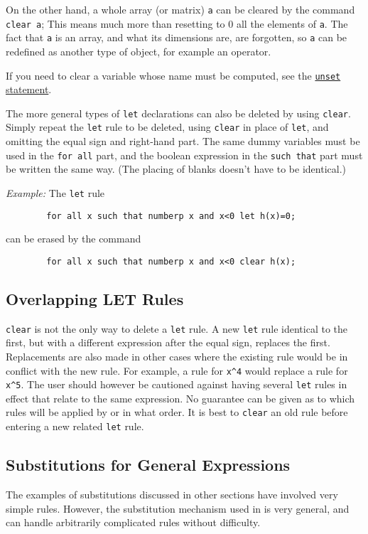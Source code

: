 On the other hand, a whole array (or matrix) \texttt{a} can be cleared by the
command \texttt{clear a};  This means much more than resetting to 0 all the
elements of \texttt{a}.  The fact that \texttt{a} is an array, and what its
dimensions are, are forgotten, so \texttt{a} can be redefined as another type
of object, for example an operator.

If you need to clear a variable whose name must be computed, see the
\hyperlink{command:UNSET}{\texttt{unset} statement}.

The more general types of \texttt{let} declarations can also be deleted by
using \texttt{clear}.  Simply repeat the \texttt{let} rule to be deleted, using
\texttt{clear} in place of \texttt{let}, and omitting the equal sign and
right-hand part.  The same dummy variables must be used in the
\texttt{for all} part, and the boolean expression in the \texttt{such that} part must be
written the same way. (The placing of blanks doesn't have to be
identical.)

\textit{Example:} The \texttt{let} rule
\begin{verbatim}
        for all x such that numberp x and x<0 let h(x)=0;
\end{verbatim}
can be erased by the command
\begin{verbatim}
        for all x such that numberp x and x<0 clear h(x);
\end{verbatim}

\subsection{Overlapping LET Rules}
\texttt{clear} is not the only way to delete a \texttt{let} rule.  A new 
\texttt{let} rule identical to the first, but with a different expression after
the equal sign, replaces the first.  Replacements are also made in other
cases where the existing rule would be in conflict with the new rule.  For
example, a rule for \texttt{x\textasciicircum 4} would replace a rule for 
\texttt{x\textasciicircum 5}.
The user should however be cautioned against having several \texttt{let}
rules in effect that relate to the same expression.  No guarantee can be
given as to which rules will be applied by {\REDUCE} or in what order.  It
is best to \texttt{clear} an old rule before entering a new related 
\texttt{let} rule.

\subsection{Substitutions for General Expressions}
\label{sec-gensubs}
The examples of substitutions discussed in other sections have involved
very simple rules. However, the substitution mechanism used in {\REDUCE} is
very general, and can handle arbitrarily complicated rules without
difficulty.

